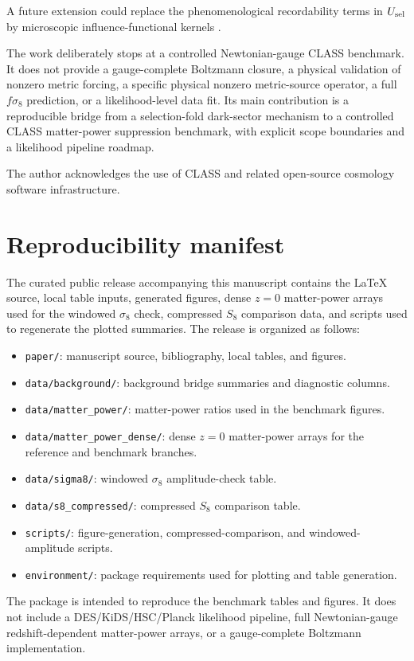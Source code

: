 ﻿\documentclass[11pt,prd,preprint,nofootinbib,amsmath,amssymb]{revtex4-2}
\begin{document}
A future extension could replace the phenomenological recordability terms in
$U_{\rm sel}$ by microscopic influence-functional kernels
\cite{FeynmanVernon1963,CaldeiraLeggett1983}.

The work deliberately stops at a controlled Newtonian-gauge CLASS benchmark. It does not provide a
gauge-complete Boltzmann closure, a physical validation of nonzero metric
forcing, a specific physical nonzero metric-source operator, a full
$f\sigma_8$ prediction, or a likelihood-level data fit. Its main contribution
is a reproducible bridge from a selection-fold dark-sector mechanism to a
controlled CLASS matter-power suppression benchmark, with explicit scope
boundaries and a likelihood pipeline roadmap.
\begin{acknowledgments}
The author acknowledges the use of CLASS and related open-source cosmology
software infrastructure.
\end{acknowledgments}

\appendix

\section{Reproducibility manifest}

The curated public release accompanying this manuscript contains the \LaTeX{}
source, local table inputs, generated figures, dense $z=0$ matter-power arrays
used for the windowed $\sigma_8$ check, compressed $S_8$ comparison data, and
scripts used to regenerate the plotted summaries. The release is organized as
follows:
\begin{itemize}
\item \texttt{paper/}: manuscript source, bibliography, local tables, and figures.
\item \texttt{data/background/}: background bridge summaries and diagnostic columns.
\item \texttt{data/matter\_power/}: matter-power ratios used in the benchmark figures.
\item \texttt{data/matter\_power\_dense/}: dense $z=0$ matter-power arrays for the reference and benchmark branches.
\item \texttt{data/sigma8/}: windowed $\sigma_8$ amplitude-check table.
\item \texttt{data/s8\_compressed/}: compressed $S_8$ comparison table.
\item \texttt{scripts/}: figure-generation, compressed-comparison, and windowed-amplitude scripts.
\item \texttt{environment/}: package requirements used for plotting and table generation.
\end{itemize}
The package is intended to reproduce the benchmark tables and figures. It does
not include a DES/KiDS/HSC/Planck likelihood pipeline, full Newtonian-gauge
redshift-dependent matter-power arrays, or a gauge-complete Boltzmann
implementation.


\end{document}
